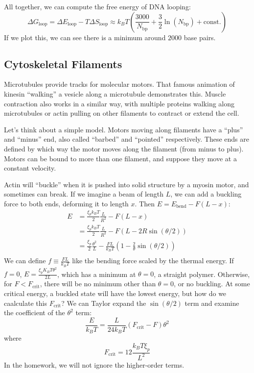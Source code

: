 \documentclass[a4paper,twoside,master.tex]{subfiles}
\begin{document}
All together, we can compute the free energy of DNA looping:
\begin{equation}
    \Delta G_{\text{loop}} = \Delta E_{\text{loop}} - T \Delta S_{\text{loop}} \approx k_B T \left( \frac{3000}{N_{\text{bp}}} + \frac{3}{2} \ln(N_{\text{bp}}) + \text{const.} \right)
\end{equation}
If we plot this, we can see there is a minimum around $ 2000 $ base pairs.

\subsection{Cytoskeletal Filaments}\label{sub:cytoskeletal_filaments}

Microtubules provide tracks for molecular motors. That famous animation of kinesin ``walking'' a vesicle along a microtubule demonstrates this. Muscle contraction also works in a similar way, with multiple proteins walking along microtubules or actin pulling on other filaments to contract or extend the cell.

Let's think about a simple model. Motors moving along filaments have a ``plus'' and ``minus'' end, also called ``barbed'' and ``pointed'' respectively. These ends are defined by which way the motor moves along the filament (from minus to plus). Motors can be bound to more than one filament, and suppose they move at a constant velocity.

Actin will ``buckle'' when it is pushed into solid structure by a myosin motor, and sometimes can break. If we imagine a beam of length $ L $, we can add a buckling force to both ends, deforming it to length $ x $. Then $ E = E_{\text{bend}} - F (L - x) $:
\begin{align}
    E &= \frac{\xi_p k_B T}{2} \frac{L}{R^2} - F(L - x) \\
      &= \frac{\xi_p k_B T}{2} \frac{L}{R^2} - F(L - 2 R \sin(\theta / 2)) \\
      &= \frac{\xi_p}{2} \frac{\theta^2}{L} - \frac{FL}{k_B T} \left( 1 - \frac{2}{\theta} \sin(\theta / 2) \right) \\
\end{align}
We can define $ f \equiv \frac{FL}{k_B T} $ like the bending force scaled by the thermal energy. If $ f = 0 $, $ E = \frac{\xi_p K_B T \theta^2}{2 L} $, which has a minimum at $ \theta = 0 $, a straight polymer. Otherwise, for $ F < F_{\text{crit}} $, there will be no minimum other than $ \theta = 0 $, or no buckling. At some critical energy, a buckled state will have the lowest energy, but how do we caalculate this $ F_{\text{crit}}  $? We can Taylor expand the $ \sin(\theta / 2) $ term and examine the coefficient of the $ \theta^2 $ term:
\begin{equation}
    \frac{E}{k_B T} = \frac{L}{24 k_B T} (F_{\text{crit}} - F) \theta^2
\end{equation}
where
\begin{equation}
    F_{\text{crit}} = 12 \frac{k_B T \xi_p}{L^2}
\end{equation}
In the homework, we will not ignore the higher-order terms.
\end{document}
